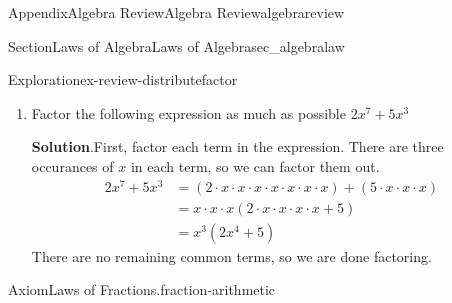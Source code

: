 \documentclass{tufte-book}
\newcommand{\blocktitlefont}{\relax}
\numberwithin{equation}{chapter}
\newcommand{\amp}{&}
\begin{document}
\begin{appendixptx}{Appendix}{Algebra Review}{}{Algebra Review}{}{}{algebrareview}
\begin{sectionptx}{Section}{Laws of Algebra}{}{Laws of Algebra}{}{}{sec_algebralaw}
\begin{exploration}{Exploration}{}{ex-review-distributefactor}
\begin{enumerate}[font=\bfseries,label=(\alph*),ref=\alph*]
\noindent\textbf{\blocktitlefont Solution}.\hypertarget{ex-review-distributefactor-9-2}{}\quad{}We want to write \(x^2 + x - 6 \) as an expression of the form \((a x + b) (c x + d) \)%
\begin{equation*}
(a x + b) (c x + d)  = (ab)x^2 + (ad+cb)x + bd
\end{equation*}
We want to pick \(a,b,c,d\) to get the right hand side to equal \(x^2+x-6\). There are three terms to consider%
\begin{itemize}[label=\textbullet]
\item{}We need \((ab)x^2=x^2\), so set \(a=b=1\). Plugging that into our factored form, we get%
\begin{equation*}
(x + b)(x+d) = x^2 + (d+b)x + bd 
\end{equation*}
%
\item{}We need the third term to be \(db=-6\).  Factoring gives \(db = (-1)\cdot 2\cdot 3\).  We must divide the factors \(-1\), \(2\), \(3\) between \(b,d\).%
\item{}To pick exact values for \(b,d\), recall that we need \(b+d=1\). Setting \(b=3\) and \(d=(-1)2\), we can confirm%
\begin{align*}
bd \amp = (3)(-1)(2) = -6\\
b+d \amp = 3 + (-1)(2) = 1
\end{align*}
as desired.%
\end{itemize}
Putting it together, we get%
\begin{align*}
x^2 + x - 6 \amp = (x+3)(x-2) 
\end{align*}
%
\item{}Factor the following expression as much as possible \(2x^7 + 5x^3 \)%
\par\smallskip%
\noindent\textbf{\blocktitlefont Solution}.\hypertarget{ex-review-distributefactor-10-2}{}\quad{}First, factor each term in the expression. There are three occurances of \(x\) in each term, so we can factor them out.%
\begin{align*}
2x^7 + 5x^3 \amp = (2\cdot x \cdot x\cdot x\cdot x\cdot x\cdot x\cdot x) + (5\cdot x\cdot x\cdot x) \\
\amp = x\cdot x\cdot x (2\cdot x\cdot x\cdot x\cdot x + 5)\\
\amp = x^3 (2 x^4 + 5)
\end{align*}
There are no remaining common terms, so we are done factoring.%
\end{enumerate}%
\end{exploration}%
\begin{axiom}{Axiom}{Laws of Fractions.}{}{fraction-arithmetic}%

\end{axiom}
\end{sectionptx}
\end{appendixptx}
\end{document}
